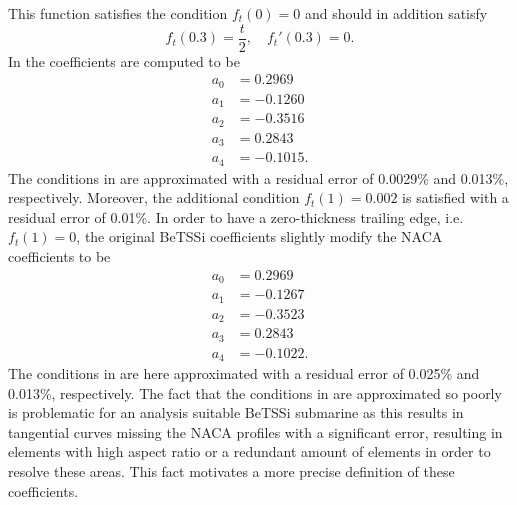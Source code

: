 This function satisfies the condition $f_t(0)=0$ and should in addition satisfy
\begin{equation}\label{Eq3:NACAmainConditions}
	f_t(0.3) = \frac{t}{2}, \quad f_t'(0.3) = 0.
\end{equation}
In \cite{Ladson1996cpt,Cummings2015gfa} the coefficients are computed to be
\begin{align*}
	a_0 &= 0.2969\\
	a_1 &=-0.1260\\
	a_2 &=-0.3516\\
	a_3 &= 0.2843\\
	a_4 &=-0.1015.
\end{align*}
The conditions in  are approximated with a residual error of 0.0029\% and 0.013\%, respectively. Moreover, the additional condition $f_t(1) = 0.002$ is satisfied with a  residual error of 0.01\%. In order to have a zero-thickness trailing edge, i.e. $f_t(1)=0$, the original BeTSSi coefficients slightly modify the NACA coefficients to be
\begin{align*}
	a_0 &= 0.2969\\
	a_1 &=-0.1267\\
	a_2 &=-0.3523\\
	a_3 &= 0.2843\\
	a_4 &=-0.1022.
\end{align*}
The conditions in  are here approximated with a residual error of 0.025\% and 0.013\%, respectively. The fact that the conditions in  are approximated so poorly is problematic for an analysis suitable BeTSSi submarine as this results in tangential curves missing the NACA profiles with a significant error, resulting in elements with high aspect ratio or a redundant amount of elements in order to resolve these areas. This fact motivates a more precise definition of these coefficients.

